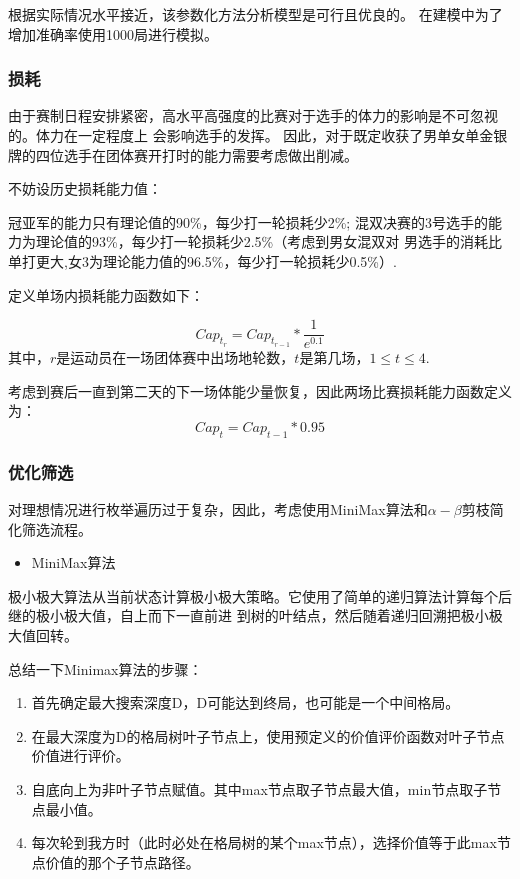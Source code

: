 \documentclass[a4paper,AutoFakeBold,AutoFakeSlant]{ctexart}
\begin{document}
根据实际情况水平接近，该参数化方法分析模型是可行且优良的。
在建模中为了增加准确率使用1000局进行模拟。

\subsubsection{损耗}
由于赛制日程安排紧密，高水平高强度的比赛对于选手的体力的影响是不可忽视的。体力在一定程度上
会影响选手的发挥。
因此，对于既定收获了男单女单金银牌的四位选手在团体赛开打时的能力需要考虑做出削减。

不妨设历史损耗能力值：

冠亚军的能力只有理论值的90\%，每少打一轮损耗少2\%;
混双决赛的3号选手的能力为理论值的93\%，每少打一轮损耗少2.5\%（考虑到男女混双对
男选手的消耗比单打更大,女3为理论能力值的96.5\%，每少打一轮损耗少0.5\%）.

定义单场内损耗能力函数如下：

\begin{equation}
  Cap_{t_r} = Cap_{t_{r-1}}*\frac{1}{e^{0.1}}
\end{equation}
其中，$r$是运动员在一场团体赛中出场地轮数，$t$是第几场，$1 \leq t \leq 4$.

考虑到赛后一直到第二天的下一场体能少量恢复，因此两场比赛损耗能力函数定义为：
\begin{equation}
  Cap_{t} = Cap_{t-1}*0.95
\end{equation}

\subsubsection{优化筛选}
对理想情况进行枚举遍历过于复杂，因此，考虑使用MiniMax算法和$\alpha-\beta$剪枝简化筛选流程。

\begin{itemize}
  \item MiniMax算法
\end{itemize}

极小极大算法从当前状态计算极小极大策略。它使用了简单的递归算法计算每个后继的极小极大值，自上而下一直前进
到树的叶结点，然后随着递归回溯把极小极大值回转。\cite{aimethod}

总结一下Minimax算法的步骤：
\begin{enumerate}
  \item 首先确定最大搜索深度D，D可能达到终局，也可能是一个中间格局。
  \item 在最大深度为D的格局树叶子节点上，使用预定义的价值评价函数对叶子节点价值进行评价。
  \item 自底向上为非叶子节点赋值。其中max节点取子节点最大值，min节点取子节点最小值。
  \item 每次轮到我方时（此时必处在格局树的某个max节点），选择价值等于此max节点价值的那个子节点路径。
\end{enumerate}
\end{document}
